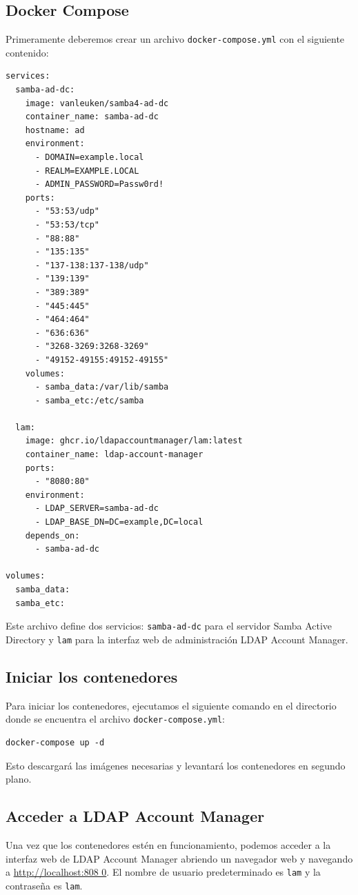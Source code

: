 \subsection{Docker Compose}
Primeramente deberemos crear un archivo \texttt{docker-compose.yml} con el siguiente contenido:
\begin{verbatim}
services:
  samba-ad-dc:
    image: vanleuken/samba4-ad-dc
    container_name: samba-ad-dc
    hostname: ad
    environment:
      - DOMAIN=example.local
      - REALM=EXAMPLE.LOCAL
      - ADMIN_PASSWORD=Passw0rd!
    ports:
      - "53:53/udp"
      - "53:53/tcp"
      - "88:88"
      - "135:135"
      - "137-138:137-138/udp"
      - "139:139"
      - "389:389"
      - "445:445"
      - "464:464"
      - "636:636"
      - "3268-3269:3268-3269"
      - "49152-49155:49152-49155"
    volumes:
      - samba_data:/var/lib/samba
      - samba_etc:/etc/samba

  lam:
    image: ghcr.io/ldapaccountmanager/lam:latest
    container_name: ldap-account-manager
    ports:
      - "8080:80"
    environment:
      - LDAP_SERVER=samba-ad-dc
      - LDAP_BASE_DN=DC=example,DC=local
    depends_on:
      - samba-ad-dc

volumes:
  samba_data:
  samba_etc:
\end{verbatim}
Este archivo define dos servicios: \texttt{samba-ad-dc} para el servidor Samba
Active Directory y \texttt{lam} para la interfaz web de administración LDAP Account Manager.
\subsection{Iniciar los contenedores}
Para iniciar los contenedores, ejecutamos el siguiente comando en el directorio donde se encuentra
el archivo \texttt{docker-compose.yml}:
\begin{verbatim}
docker-compose up -d
\end{verbatim}
Esto descargará las imágenes necesarias y levantará los contenedores en segundo plano.
\subsection{Acceder a LDAP Account Manager}
Una vez que los contenedores estén en funcionamiento, podemos acceder a la interfaz web de LDAP
Account Manager abriendo un navegador web y navegando a \url{http://localhost:808
0}. El nombre de usuario predeterminado es \texttt{lam} y la
contraseña es \texttt{lam}.
